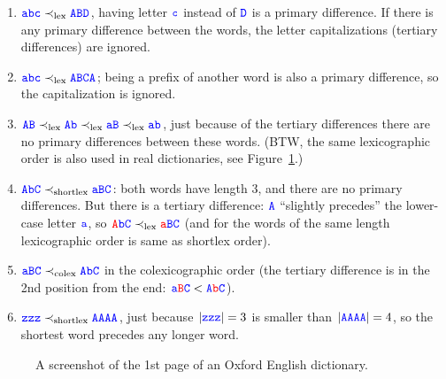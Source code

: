 \documentclass[11pt]{article}
\begin{document}
\begin{enumerate}
\item $\textcolor{blue}{\mathtt{abc}} \prec_{\text{lex}} \textcolor{blue}{\mathtt{ABD}}$, 
having letter $\textcolor{blue}{\mathtt{c}}$
instead of $\textcolor{blue}{\mathtt{D}}$ is a primary difference. If there is any primary 
difference between the words, the letter capitalizations (tertiary differences) are ignored.
\item $\textcolor{blue}{\mathtt{abc}} \prec_{\text{lex}} \textcolor{blue}{\mathtt{ABCA}}$; 
being a prefix of another word is also a primary difference, so the capitalization is ignored.
\item $\textcolor{blue}{\mathtt{AB}} \prec_{\text{lex}} \textcolor{blue}{\mathtt{Ab}} \prec_{\text{lex}} 
\textcolor{blue}{\mathtt{aB}} \prec_{\text{lex}} \textcolor{blue}{\mathtt{ab}}$, 
just because of the tertiary differences \textendash{} there are no 
primary differences between these words. 
(BTW, the same lexicographic order is also used in real dictionaries, see Figure~\ref{fig:oxford-dictionary}.)
\item $\textcolor{blue}{\mathtt{AbC}} \prec_{\text{shortlex}} \textcolor{blue}{\mathtt{aBC}}$: 
both words have length $3$, and there are no primary differences. But there is a tertiary 
difference: $\textcolor{blue}{\mathtt{A}}$
``slightly precedes'' the lower-case letter $\textcolor{blue}{\mathtt{a}}$, 
so  $\textcolor{red}{\mathtt{A}}\textcolor{blue}{\mathtt{bC}} 
\prec_{\text{lex}} \textcolor{red}{\mathtt{a}}\textcolor{blue}{\mathtt{BC}}$ (and for the 
words of the same length lexicographic order is same as shortlex order). 
\item $\textcolor{blue}{\mathtt{aBC}} \prec_{\text{colex}} \textcolor{blue}{\mathtt{AbC}}$
in the colexicographic order (the tertiary difference is in the 2nd position from the end: 
$\textcolor{blue}{\mathtt{a}}\textcolor{red}{\mathtt{B}}\textcolor{blue}{\mathtt{C}} < 
\textcolor{blue}{\mathtt{A}}\textcolor{red}{\mathtt{b}}\textcolor{blue}{\mathtt{C}}$). 
\item $\textcolor{blue}{\mathtt{zzz}} \prec_{\text{shortlex}} \textcolor{blue}{\mathtt{AAAA}}$, 
just because $|\textcolor{blue}{\mathtt{zzz}}| =3$ is smaller than 
$|\textcolor{blue}{\mathtt{AAAA}}|=4$, so the shortest word precedes any longer word. 
\end{enumerate}


\begin{figure}[!htb]
\caption{\label{fig:oxford-dictionary} A screenshot of the 1st page of an Oxford English dictionary.}
\end{figure}
\end{document}
